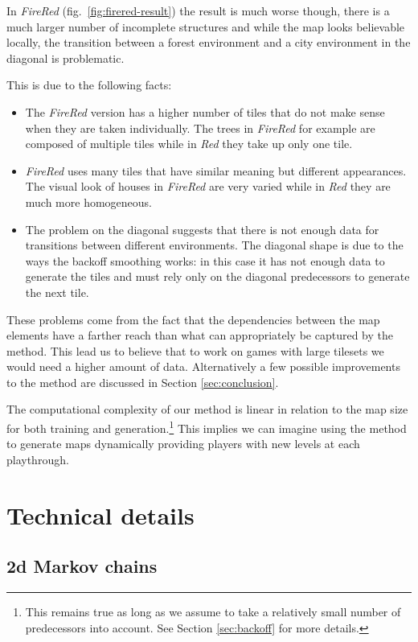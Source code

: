 \documentclass[A4paper,]{article}
\providecommand{\tightlist}{%
  \setlength{\itemsep}{0pt}\setlength{\parskip}{0pt}}
\begin{document}
In \emph{FireRed} (fig.~\ref{fig:firered-result}) the result is much
worse though, there is a much larger number of incomplete structures and
while the map looks believable locally, the transition between a forest
environment and a city environment in the diagonal is problematic.

This is due to the following facts:

\begin{itemize}
\tightlist
\item
  The \emph{FireRed} version has a higher number of tiles that do not
  make sense when they are taken individually. The trees in
  \emph{FireRed} for example are composed of multiple tiles while in
  \emph{Red} they take up only one tile.
\item
  \emph{FireRed} uses many tiles that have similar meaning but different
  appearances. The visual look of houses in \emph{FireRed} are very
  varied while in \emph{Red} they are much more homogeneous.
\item
  The problem on the diagonal suggests that there is not enough data for
  transitions between different environments. The diagonal shape is due
  to the ways the backoff smoothing works: in this case it has not
  enough data to generate the tiles and must rely only on the diagonal
  predecessors to generate the next tile.
\end{itemize}

These problems come from the fact that the dependencies between the map
elements have a farther reach than what can appropriately be captured by
the method. This lead us to believe that to work on games with large
tilesets we would need a higher amount of data. Alternatively a few
possible improvements to the method are discussed in Section
\ref{sec:conclusion}.

The computational complexity of our method is linear in relation to the
map size for both training and generation.\footnote{This remains true as
  long as we assume to take a relatively small number of predecessors
  into account. See Section \ref{sec:backoff} for more details.} This
implies we can imagine using the method to generate maps dynamically
providing players with new levels at each playthrough.

\section{Technical details}\label{technical-details}

\subsection{2d Markov chains}\label{sec:markov-chains}
\end{document}

